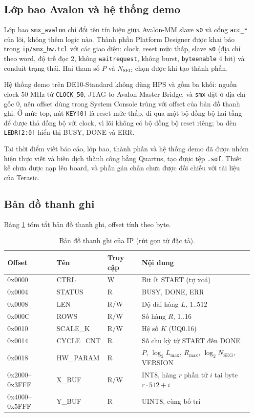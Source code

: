 \subsection{Lớp bao Avalon và hệ thống demo}

Lớp bao \texttt{smx\_avalon} chỉ đổi tên tín hiệu giữa Avalon-MM slave \texttt{s0} và cổng \texttt{acc\_*} của lõi, không thêm logic nào. Thành phần Platform Designer được khai báo trong \texttt{ip/smx\_hw.tcl} với các giao diện: clock, reset mức thấp, slave \texttt{s0} (địa chỉ theo word, độ trễ đọc 2, không \texttt{waitrequest}, không burst, \texttt{byteenable} 4 bit) và conduit trạng thái. Hai tham số $P$ và $N_{\text{SEG}}$ chọn được khi tạo thành phần.

Hệ thống demo trên DE10-Standard không dùng HPS và gồm ba khối: nguồn clock 50 MHz từ \texttt{CLOCK\_50}, JTAG to Avalon Master Bridge, và \texttt{smx} đặt ở địa chỉ gốc 0, nên offset dùng trong System Console trùng với offset của bản đồ thanh ghi. Ở mức top, nút \texttt{KEY[0]} là reset mức thấp, đi qua một bộ đồng bộ hai tầng để được thả đồng bộ với clock, vì lõi không có bộ đồng bộ reset riêng; ba đèn \texttt{LEDR[2:0]} hiển thị BUSY, DONE và ERR.

Tại thời điểm viết báo cáo, lớp bao, thành phần và hệ thống demo đã được nhóm hiện thực viết và biên dịch thành công bằng Quartus, tạo được tệp \texttt{.sof}. Thiết kế chưa được nạp lên board, và phần gán chân chưa được đối chiếu với tài liệu của Terasic.

\subsection{Bản đồ thanh ghi}

Bảng \ref{tab:regmap} tóm tắt bản đồ thanh ghi, offset tính theo byte.

\begin{table}[htbp]
\centering
\small
\begin{tabular}{lllp{7.2cm}}
\toprule
Offset & Tên & Truy cập & Nội dung \\
\midrule
0x0000 & CTRL      & W   & Bit 0: START (tự xoá) \\
0x0004 & STATUS    & R   & BUSY, DONE, ERR \\
0x0008 & LEN       & R/W & Độ dài hàng $L$, 1..512 \\
0x000C & ROWS      & R/W & Số hàng $R$, 1..16 \\
0x0010 & SCALE\_K  & R/W & Hệ số $K$ (UQ0.16) \\
0x0014 & CYCLE\_CNT & R  & Số chu kỳ từ START đến DONE \\
0x0018 & HW\_PARAM & R   & $P$, $\log_2 L_{\max}$, $R_{\max}$, $\log_2 N_{\text{SEG}}$, VERSION \\
0x2000--0x3FFF & X\_BUF & R/W & INT8, hàng $r$ phần tử $i$ tại byte $r \cdot 512 + i$ \\
0x4000--0x5FFF & Y\_BUF & R   & UINT8, cùng bố trí \\
\bottomrule
\end{tabular}
\caption{Bản đồ thanh ghi của IP (rút gọn từ đặc tả).}
\label{tab:regmap}
\end{table}

